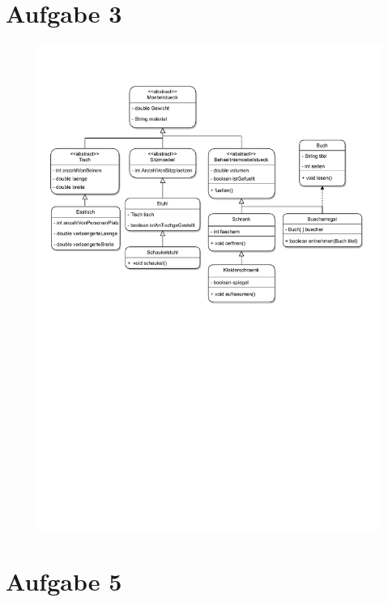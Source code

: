 \documentclass[a4paper,11pt]{scrartcl}
\begin{document}
\section*{Aufgabe 3}

	\begin{figure}[h]
		\includegraphics[width=1.25\textwidth]{Moebelstueck.pdf}
		\centering
	\end{figure}

\section*{Aufgabe 5}
\end{document}
